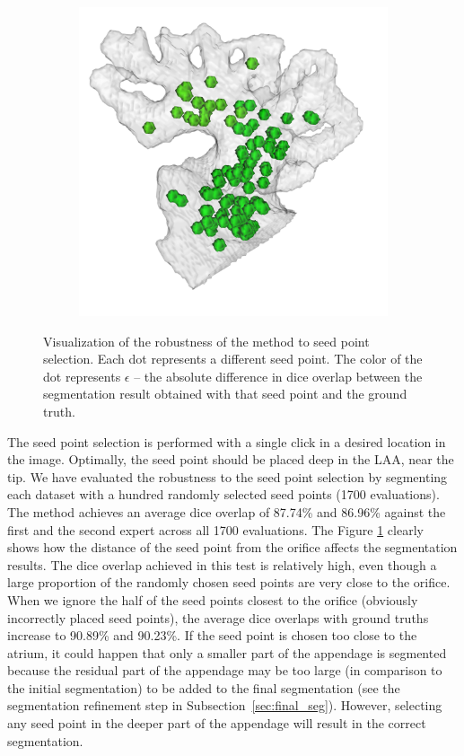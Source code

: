 \documentclass[review]{elsarticle}
\begin{document}
\begin{figure}[t]
\begin{subfigure}[b]{.21\linewidth}
    \includegraphics[width=\textwidth]{fig16_6.png}
    \caption{}
  \end{subfigure}%

  \caption{ Visualization of the robustness of the method to seed point
    selection.  Each dot represents a different seed point. The color
    of the dot represents $\epsilon$ -- the absolute difference in dice overlap between
    the segmentation result obtained with that seed point and the ground truth. 
  }
  \label{fig:seeds_robustness}
\end{figure}

The seed point selection is performed with a single click in a desired location
in the image. Optimally, the seed point should be placed deep in the LAA, near
the tip. 
  We have evaluated the robustness to the seed point selection
  by segmenting each dataset with a hundred randomly selected seed points (1700 evaluations). 
  The method achieves an average dice overlap of 87.74\% and 86.96\% against 
  the first and the second expert across all 1700 evaluations.
  The Figure \ref{fig:seeds_robustness} clearly shows how the distance of 
  the seed point from the orifice affects the segmentation results. 
  The dice overlap achieved in this test is relatively high, even though a large proportion
  of the randomly chosen seed points are very close to the orifice.
  When we ignore the half of the seed points closest to the orifice (obviously 
  incorrectly placed seed points), 
  the average dice overlaps with ground truths increase to 90.89\% and 90.23\%.
If the seed point is chosen too close to the atrium, it could happen that only
a smaller part of the appendage is segmented because the residual part of the
appendage may be too large (in comparison to the initial segmentation) to be
added to the final segmentation (see the segmentation refinement step in
Subsection~\ref{sec:final_seg}). However, selecting any seed point in the
deeper part of the appendage will result in the correct segmentation.
\end{document}
